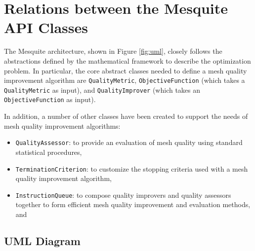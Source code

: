 \documentclass[letter]{report}
\begin{document}
\section{Relations between the Mesquite API Classes}

The Mesquite architecture, shown in Figure \ref{fig:uml}, closely
follows the abstractions defined by the mathematical framework 
to describe the optimization problem.
In particular, the core abstract classes needed to
define a mesh quality improvement algorithm are {\tt QualityMetric},
{\tt ObjectiveFunction} (which takes a {\tt QualityMetric} as
input), and {\tt QualityImprover} (which takes an {\tt ObjectiveFunction}
as input).

In addition, a number of other classes have been created to support
the needs of mesh quality improvement algorithms:
\begin{itemize}
\item {\tt QualityAssessor}: to provide an evaluation of mesh
quality using standard statistical procedures,
\item {\tt TerminationCriterion}: to customize the stopping criteria
used with a mesh quality improvement algorithm,
\item {\tt InstructionQueue}: to compose quality improvers and
quality assessors together to form efficient mesh quality improvement
and evaluation methods, and
\end{itemize}

\subsection{UML Diagram}
\end{document}
